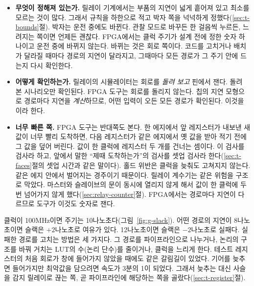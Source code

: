 \begin{itemize}
\item \textbf{무엇이 정해져 있는가.} 릴레이 기계에서는 부품의 지연이 넓게 흩어져 있고 최소를 모르는 것이
많다. 그래서 규칙을 하한으로 적고 박자 쪽을 넉넉하게 정했다(\ref{sec:t-bounds}절). 박자는 운전 중에도
바뀐다. 관찰 모드로 바꾸든 한 걸음씩 누르든, 느려지는 쪽이면 언제든 괜찮다. FPGA에서는 클럭 주기가 설계
전에 정한 숫자 하나이고 운전 중에 바뀌지 않는다. 바뀌는 것은 회로 쪽이다. 코드를 고치거나 배치가 달라질
때마다 경로의 지연이 달라지고, 그때마다 모든 경로가 그 주기 안에 드는지 다시 확인한다.
\item \textbf{어떻게 확인하는가.} 릴레이의 시뮬레이터는 회로를 \emph{돌려 보고} 핀에서 잰다. 돌려 본
시나리오만 확인된다. FPGA 도구는 회로를 돌리지 않는다. 칩의 지연 모형으로 경로마다 지연을 \emph{계산}하므로,
어떤 입력이 오든 모든 경로가 확인된다. 이것을 이라 한다.
\item \textbf{너무 빠른 쪽.} FPGA 도구는 반대쪽도 본다. 한 에지에서 앞 레지스터가 내보낸 새 값이 너무 빨리
도착하면, 다음 레지스터가 같은 에지에서 옛 값을 받아 적기 전에 그 값을 덮어 버린다. 값이 한 클럭에 레지스터
두 개를 건너는 셈이다. 이 검사를  검사라 하고, 앞에서 말한 ``제때 도착하는가''의 검사를
셋업 검사라 한다(\ref{sec:t-faces}절의 셋업 시간과 같은 말이다). 홀드 위반은 클럭을 늦춰도 고쳐지지 않는다.
같은 에지 안에서 벌어지는 경주이기 때문이다. 릴레이 계수기는 같은 위험을 구조로 막았다. 마스터와 슬레이브의
문이 동시에 열리지 않게 해서 값이 한 클럭에 두 번 넘어가지 않게 했다(\ref{sec:relay-counter}절). FPGA에서는
경로마다 지연이 다르므로 도구가 이것도 숫자로 잰다.
\end{itemize}

\General 클럭이 100MHz이면 주기는 10나노초다(그림~\ref{fig:g-slack}). 어떤 경로의 지연이 8나노초이면
슬랙은 $+2$나노초로 여유가 있다. 12나노초이면 슬랙은 $-2$나노초로 실패다. 실패한 경로를 고치는 방법은
세 가지다. 그 경로를 파이프라인으로 나누거나, 논리의 구조를 바꿔 거치는 LUT의 수(논리 단수)를 줄이거나,
클럭을 느리게 한다. 테스트 레지스터의 처음 회로가 창에 들어가지 않았을 때에도 같은 갈림길이 있었다. 기어를
늦추면 들어가지만 최악값을 담으려면 속도가 3분의 1이 되었다. 그래서 늦추는 대신 사슬을 감지 릴레이로 끊는
쪽, 곧 파이프라인에 해당하는 쪽을 골랐다(\ref{sec:t-register}절).

